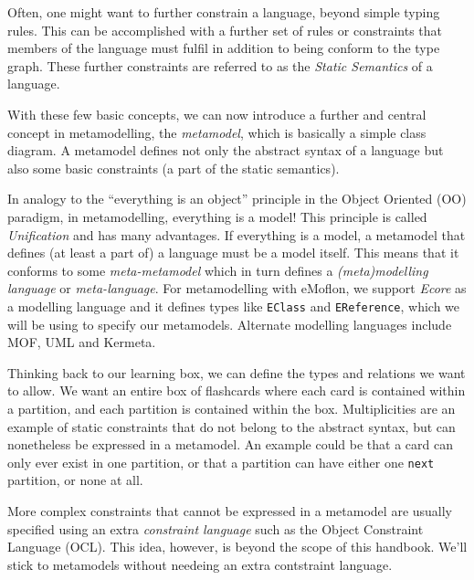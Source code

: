 Often, one might want to further constrain a language, beyond simple typing rules.
This can be accomplished with a further set of rules or constraints that members of the language must fulfil in addition to being conform to the type graph.
These further constraints are referred to as the \emph{Static Semantics} of a language.

With these few basic concepts, we can now introduce a further and central concept in metamodelling, the \emph{metamodel}, which is basically a simple class diagram. 
A metamodel defines not only the abstract syntax of a language but also some basic constraints (a part of the static semantics).

In analogy to the ``everything is an object'' principle in the Object Oriented (OO) paradigm, in metamodelling, everything is a model!  This principle is called \emph{Unification} and has many advantages. If everything is a model, a metamodel that defines (at least a part of) a language must be a model itself.
This means that it conforms to some \emph{meta-metamodel} which in turn defines a \emph{(meta)modelling language} or \emph{meta-language}.
For metamodelling with eMoflon, we support \emph{Ecore} as a modelling language and it defines types like \texttt{EClass} and \texttt{EReference}, which we will be using to specify  our metamodels.
Alternate modelling languages include MOF, UML and Kermeta.

Thinking back to our learning box, we can define the types and relations we want to allow. We want an entire box of flashcards where each card is contained within a partition, and each partition is contained within the box. Multiplicities are an example of static constraints that do not belong to the abstract syntax, but can nonetheless be expressed in a metamodel.
An example could be that a card can only ever exist in one partition, or that a partition can have either one \texttt{next} partition, or none at all.

\pagebreak
More complex constraints that cannot be expressed in a metamodel are usually specified using an extra \emph{constraint language} such as the Object Constraint Language (OCL). This idea, however,  is beyond the scope of this handbook. We'll stick to metamodels without needeing an extra contstraint language. 


